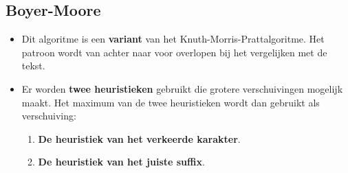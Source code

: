\subsection{Boyer-Moore}
\begin{itemize}
    \item Dit algoritme is een \textbf{variant} van het Knuth-Morris-Prattalgoritme.
    \alert Het patroon wordt van achter naar voor overlopen bij het vergelijken met de tekst.
    \item Er worden \textbf{twee heuristieken} gebruikt die grotere verschuivingen mogelijk maakt. Het maximum van de twee heuristieken wordt dan gebruikt als verschuiving:
    \begin{enumerate}
        \item \textbf{De heuristiek van het verkeerde karakter}.
        \item \textbf{De heuristiek van het juiste suffix}.
    \end{enumerate}
\end{itemize}

